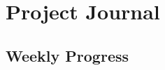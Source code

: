 \chapter{Project Journal}

\label{chap:journal}

\section{Weekly Progress}

\label{sec:progress}

\todo

